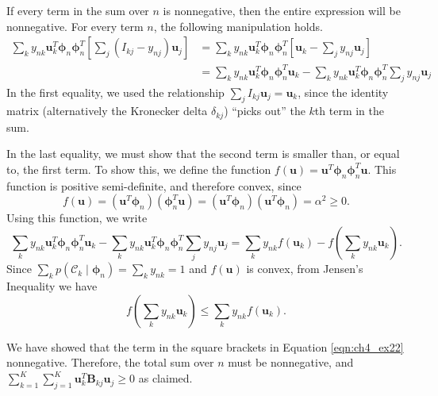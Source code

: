\documentclass[12pt, a4paper]{article}
\newcommand{\vect}[1]{\bm{#1}}
\begin{document}
If every term in the sum over $n$ is nonnegative, then the entire expression will be nonnegative.
For every term $n$, the following manipulation holds.
\begin{align*}
	\sum_k y_{nk} \vect{u}_k^T \vect{\phi}_n \vect{\phi}_n^T
	\left[ \sum_j \left(I_{kj} - y_{nj}\right) \vect{u}_j \right]
	&=  
	\sum_k y_{nk} \vect{u}_k^T \vect{\phi}_n \vect{\phi}_n^T
	\left[ \vect{u}_k -  \sum_j   y_{nj} \vect{u}_j \right] \\
	&=  
	\sum_k y_{nk} \vect{u}_k^T \vect{\phi}_n \vect{\phi}_n^T \vect{u}_k
	-
	\sum_k y_{nk} \vect{u}_k^T \vect{\phi}_n \vect{\phi}_n^T
	\sum_j   y_{nj} \vect{u}_j
\end{align*}
In the first equality, we used the relationship $\sum_j I_{kj} \vect{u}_j = \vect{u}_k$, since the identity matrix (alternatively the Kronecker delta $\delta_{kj}$) ``picks out'' the $k$th term in the sum.

In the last equality, we must show that the second term is smaller than, or equal to, the first term.
To show this, we define the function $f(\vect{u}) = \vect{u}^T \vect{\phi}_n \vect{\phi}_n^T  \vect{u}$.
This function is positive semi-definite, and therefore convex, since
\begin{equation*}
	f(\vect{u}) = \left( \vect{u}^T \vect{\phi}_n \right) 
	\left( \vect{\phi}_n^T  \vect{u} \right)
	= \left( \vect{u}^T \vect{\phi}_n \right) 
	\left(   \vect{u}^T \vect{\phi}_n \right) = \alpha^2 \geq 0.
\end{equation*}
Using this function, we write
\begin{equation*}
	\sum_k y_{nk} \vect{u}_k^T \vect{\phi}_n \vect{\phi}_n^T \vect{u}_k
	-
	\sum_k y_{nk} \vect{u}_k^T \vect{\phi}_n \vect{\phi}_n^T
	\sum_j   y_{nj} \vect{u}_j
	= \sum_k y_{nk} f(\vect{u}_k)
	-
	f\left(\sum_k y_{nk} \vect{u}_k  \right).
\end{equation*}
Since $\sum_k p \left( \mathcal{C}_k \mid \vect{\phi}_n \right) = 
\sum_k y_{nk} = 1$ and $f(\vect{u})$ is convex, from Jensen's Inequality we have
\begin{equation*}
	f\left(\sum_k y_{nk} \vect{u}_k  \right) \leq \sum_k y_{nk} f(\vect{u}_k).
\end{equation*}

We have showed that the term in the square brackets in Equation \eqref{eqn:ch4_ex22} nonnegative.
Therefore, the total sum over $n$ must be nonnegative, and $\sum_{k=1}^{K} \sum_{j=1}^{K} \vect{u}_k^T \vect{B}_{kj} \vect{u}_j \geq 0$ as claimed.
\end{document}

